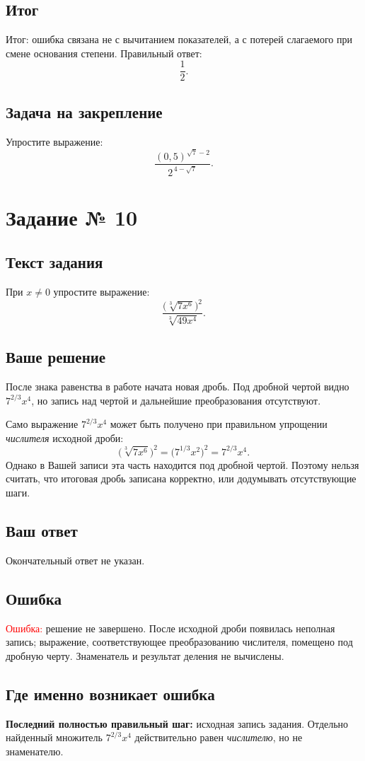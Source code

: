\documentclass[11pt,a4paper]{article}
\begin{document}
\subsection*{Итог}
\textcolor{teal!60!black}{Итог:} ошибка связана не с вычитанием
показателей, а с потерей слагаемого при смене основания степени.
Правильный ответ:
\[
\boxed{\frac12}.
\]
\subsection*{Задача на закрепление}
Упростите выражение:
\[
\frac{(0{,}5)^{\sqrt7-2}}{2^{\,4-\sqrt7}}.
\]

\clearpage
{}\label{task:10}
\section*{Задание № 10}
\subsection*{Текст задания}
При $x\ne0$ упростите выражение:
\[
\frac{\bigl(\sqrt[3]{7x^6}\bigr)^2}{\sqrt[3]{49x^4}}.
\]
\subsection*{Ваше решение}
После знака равенства в работе начата новая дробь. Под дробной
чертой видно $7^{2/3}x^4$, но запись над чертой и дальнейшие
преобразования отсутствуют.

Само выражение $7^{2/3}x^4$ может быть получено при правильном
упрощении \emph{числителя} исходной дроби:
\[
\bigl(\sqrt[3]{7x^6}\bigr)^2
=\bigl(7^{1/3}x^2\bigr)^2
=7^{2/3}x^4.
\]
Однако в Вашей записи эта часть находится под дробной чертой.
Поэтому нельзя считать, что итоговая дробь записана корректно,
или додумывать отсутствующие шаги.
\subsection*{Ваш ответ}
Окончательный ответ не указан.
\subsection*{Ошибка}
\textcolor{red}{Ошибка:} решение не завершено. После исходной дроби
появилась неполная запись; выражение, соответствующее преобразованию
числителя, помещено под дробную черту. Знаменатель и результат
деления не вычислены.
\subsection*{Где именно возникает ошибка}
\textbf{Последний полностью правильный шаг:} исходная запись задания.
Отдельно найденный множитель $7^{2/3}x^4$ действительно равен
\emph{числителю}, но не знаменателю.
\end{document}
